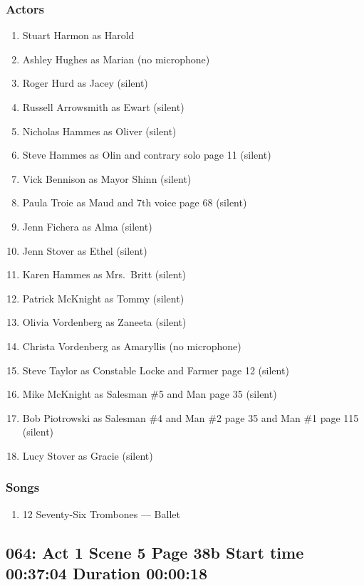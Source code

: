 \subsubsection{Actors}
\begin{enumerate}
\item Stuart Harmon as Harold
\item Ashley Hughes as Marian (no microphone)
\item Roger Hurd as Jacey (silent)
\item Russell Arrowsmith as Ewart (silent)
\item Nicholas Hammes as Oliver (silent)
\item Steve Hammes as Olin and contrary solo page 11 (silent)
\item Vick Bennison as Mayor Shinn (silent)
\item Paula Troie as Maud and 7th voice page 68 (silent)
\item Jenn Fichera as Alma (silent)
\item Jenn Stover as Ethel (silent)
\item Karen Hammes as Mrs.~Britt (silent)
\item Patrick McKnight as Tommy (silent)
\item Olivia Vordenberg as Zaneeta (silent)
\item Christa Vordenberg as Amaryllis (no microphone)
\item Steve Taylor as Constable Locke and Farmer page 12 (silent)
\item Mike McKnight as Salesman \#5 and Man page 35 (silent)
\item Bob Piotrowski as Salesman \#4 and Man \#2 page 35 and Man \#1 page 115 (silent)
\item Lucy Stover as Gracie (silent)
\end{enumerate}

\subsubsection{Songs}
\begin{enumerate}
\item 12 Seventy-Six Trombones --- Ballet
\end{enumerate}
\subsection{064: Act 1 Scene 5 Page 38b Start time 00:37:04 Duration 00:00:18}

